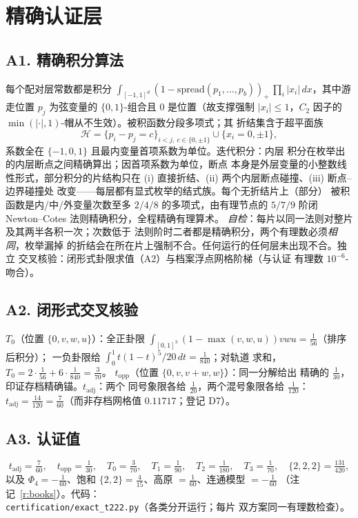\documentclass[11pt]{article}
\numberwithin{equation}{section}
\theoremstyle{definition}
\theoremstyle{remark}
\begin{document}
\section{精确认证层}\label{a:cert}

\subsection*{A1. 精确积分算法}

每个配对层常数都是积分
$\int_{[-1,1]^{d}}(1-\mathrm{spread}(p_1,\dots,p_b))_+\,
\prod_i|x_i|\,dx$，其中游走位置 $p_j$ 为弦变量的
$\{0,1\}$-组合且 $0$ 是位置（故支撑强制 $|x_i|\le1$，$C_2$
因子的 $\min(|\cdot|,1)$-帽从不生效）。被积函数分段多项式；其
折结集含于超平面族
\[
\mathcal H=\bigl\{p_i-p_j=c\bigr\}_{i<j,\ c\in\{0,\pm1\}}
\cup\bigl\{x_i=0,\pm1\bigr\},
\]
系数全在 $\{-1,0,1\}$ 且最内变量首项系数为单位。迭代积分：内层
积分在枚举出的内层断点之间精确算出；因首项系数为单位，断点
本身是外层变量的小整数线性形式，部分积分的片结构只在 (i)
直接折结、(ii) 两个内层断点碰撞、(iii) 断点--边界碰撞处
改变——每层都有显式枚举的结式族。每个无折结片上（部分）
被积函数是内/中/外变量次数至多 $2/4/8$ 的多项式，由有理节点的
$5/7/9$ 阶闭 Newton--Cotes 法则精确积分，全程精确有理算术。
\emph{自检}：每片以同一法则对整片及其两半各积一次；次数低于
法则阶时二者都是精确积分，两个有理数必须\emph{相同}，枚举漏掉
的折结会在所在片上强制不合。任何运行的任何层未出现不合。独立
交叉核验：闭形式卦限求值（A2）与档案浮点网格阶梯（与认证
有理数 $10^{-6}$-吻合）。

\subsection*{A2. 闭形式交叉核验}

$T_0$（位置 $\{0,v,w,u\}$）：全正卦限
$\int_{[0,1]^3}(1-\max(v,w,u))vwu=\tfrac1{56}$（排序后积分）；
一负卦限给 $\int_0^1t(1-t)^5/20\,dt=\tfrac1{840}$；对轨道
求和，$T_0=2\cdot\tfrac1{56}+6\cdot\tfrac1{840}=\tfrac3{70}$。
$t_{\mathrm{opp}}$（位置 $\{0,v,v{+}w,w\}$）：同一分解给出
精确的 $\tfrac1{30}$，印证存档精确锚。$t_{\mathrm{adj}}$：两个
同号象限各给 $\tfrac1{20}$，两个混号象限各给 $\tfrac1{120}$：
$t_{\mathrm{adj}}=\tfrac{14}{120}=\tfrac7{60}$（而非存档网格值
$0.11717$；登记 D7）。

\subsection*{A3. 认证值}

\[
t_{\mathrm{adj}}=\tfrac7{60},\quad
t_{\mathrm{opp}}=\tfrac1{30},\quad
T_0=\tfrac3{70},\quad
T_1=\tfrac1{90},\quad
T_2=\tfrac1{180},\quad
T_3=\tfrac1{70},\quad
\{2,2,2\}=\tfrac{131}{420},
\]
以及 $\Phi_4=-\tfrac1{60}$、饱和 $\{2,2\}=\tfrac4{15}$、高原
$=\tfrac1{60}$、连通模型 $=-\tfrac1{60}$
（注记~\ref{r:books}）。代码：\\
\texttt{certification/exact\_t222.py}（各类分开运行；每片
双方案同一有理数检查）。
\end{document}
